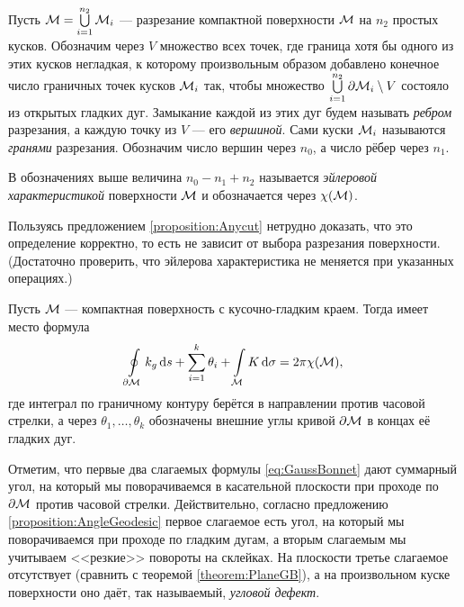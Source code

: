 Пусть $\mathcal{M} = \bigcup\limits_{i = 1}^{n_2}\mathcal{M}_i$ --- разрезание компактной поверхности $\mathcal{M}$ на $n_2$ простых кусков. Обозначим через $V$ множество всех точек, где граница хотя бы одного из этих кусков негладкая, к которому произвольным образом добавлено конечное число граничных точек кусков $\mathcal{M}_i$ так, чтобы множество $\bigcup\limits_{i = 1}^{n_2}\partial\mathcal{M}_i \setminus V$ состояло из открытых гладких дуг. Замыкание каждой из этих дуг будем называть \textit{ребром} разрезания, а каждую точку из $V$ --- его \textit{вершиной}. Сами куски $\mathcal{M}_i$ называются \textit{гранями} разрезания. Обозначим число вершин через $n_0$, а число рёбер через $n_1$.

\begin{definition}
	В обозначениях выше величина $n_0 - n_1 + n_2$ называется \textit{эйлеровой характеристикой} поверхности $\mathcal{M}$ и обозначается через $\chi(\mathcal{M})$.
\end{definition}

Пользуясь предложением \ref{proposition:Anycut} нетрудно доказать, что это определение корректно, то есть не зависит от выбора разрезания поверхности. (Достаточно проверить, что эйлерова характеристика не меняется при указанных операциях.)

\begin{theorem} %
	Пусть $\mathcal{M}$ --- компактная поверхность с кусочно-гладким краем. Тогда имеет место формула
	\begin{equation} \label{eq:GaussBonnet}
		\oint\limits_{\partial \mathcal{M}}k_g\mathop{}\!\mathrm{d} s + \sum_{i = 1}^k\theta_i + \int\limits_{\mathcal{M}}K\mathop{}\!\mathrm{d}\sigma = 2\pi\chi(\mathcal{M}),
	\end{equation}
	где интеграл по граничному контуру берётся в направлении против часовой стрелки, а через $\theta_1, \ldots, \theta_k$ обозначены внешние углы кривой $\partial \mathcal{M}$ в концах её гладких дуг.
\end{theorem}

Отметим, что первые два слагаемых формулы \eqref{eq:GaussBonnet} дают суммарный угол, на который мы поворачиваемся в касательной плоскости при проходе по $\partial \mathcal{M}$ против часовой стрелки. Действительно, согласно предложению \ref{proposition:AngleGeodesic} первое слагаемое есть угол, на который мы поворачиваемся при проходе по гладким дугам, а вторым слагаемым мы учитываем <<резкие>> повороты на склейках. На плоскости третье слагаемое отсутствует (сравнить с теоремой \ref{theorem:PlaneGB}), а на произвольном куске поверхности оно даёт, так называемый, \textit{угловой дефект}.

